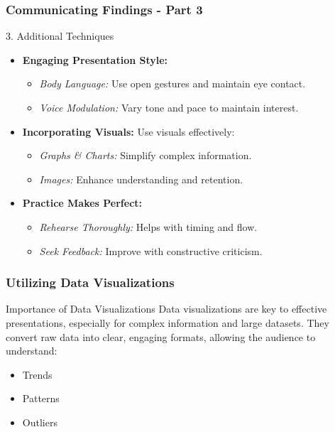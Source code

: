 \documentclass[aspectratio=169]{beamer}
\begin{document}
\begin{frame}[fragile]
    \frametitle{Communicating Findings - Part 3}
    \begin{block}{3. Additional Techniques}
        \begin{itemize}
            \item \textbf{Engaging Presentation Style:}
            \begin{itemize}
                \item \textit{Body Language:} Use open gestures and maintain eye contact.
                \item \textit{Voice Modulation:} Vary tone and pace to maintain interest.
            \end{itemize}
            \item \textbf{Incorporating Visuals:} Use visuals effectively:
            \begin{itemize}
                \item \textit{Graphs \& Charts:} Simplify complex information.
                \item \textit{Images:} Enhance understanding and retention.
            \end{itemize}
            \item \textbf{Practice Makes Perfect:}
            \begin{itemize}
                \item \textit{Rehearse Thoroughly:} Helps with timing and flow.
                \item \textit{Seek Feedback:} Improve with constructive criticism.
            \end{itemize}
        \end{itemize}
    \end{block}
\end{frame}

\begin{frame}[fragile]
    \frametitle{Utilizing Data Visualizations}
    \begin{block}{Importance of Data Visualizations}
        Data visualizations are key to effective presentations, especially for complex information and large datasets. They convert raw data into clear, engaging formats, allowing the audience to understand:
        \begin{itemize}
            \item Trends
            \item Patterns
            \item Outliers
        \end{itemize}
    \end{block}
\end{frame}
\end{document}

